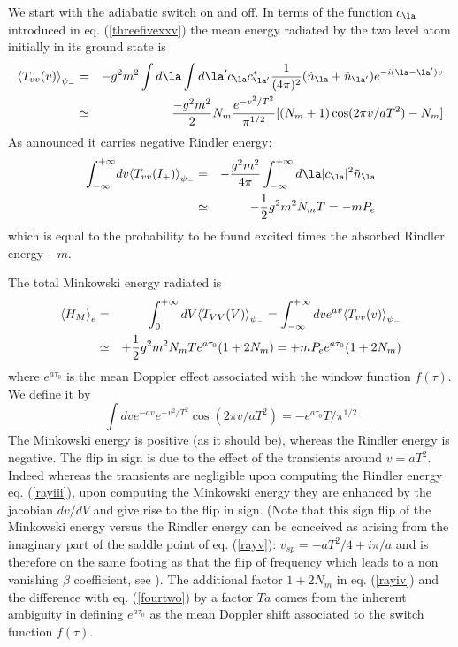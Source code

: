 \documentclass[12pt]{article}
\begin{document}
We start with the adiabatic switch on and off.
In terms of the function
 $c_\la$ introduced in eq. (\ref{threefivexxv}) the mean energy
radiated by the two
level atom
initially in its ground state is
\begin{eqnarray}
\bk{T_{vv}(v)}_{\psi_-}  &=& -
g^2m^2\int d\la \int d\la^\prime c_\la c^*_{\la^\prime}
{1 \over (4 \pi)^2} (\tilde n_\la + \tilde n_{\la^\prime})
e^{-i(\la-\la^\prime)v}
\nonumber\\
&\simeq&{-
{g^2 m^2} \over 2  }
N_m  { e^{-v^2/T^2} \over\pi^{1/2}}
[ (N_m + 1) \cos (2 \pi v/aT^2) - N_m]
\label{rayii}
\end{eqnarray}
As announced it carries negative
Rindler energy:
 \begin{eqnarray}
\int^{+\infty}_{-\infty} \!dv \bk{T_{vv}(I_+)}_{\psi_-} &=& -  {g^2
m^2 \over 4 \pi} \int^{+\infty}_{-\infty}
d\la
\vert c_\la \vert^2  \tilde n_\la
 \nonumber\\  &\simeq&
-{1 \over 2}g^2 m^2 N_mT= -m P_{e}
\label{rayiii}
\end{eqnarray}
which is equal to the probability to be found excited times the absorbed
Rindler energy
$-m$.

The total Minkowski energy radiated is
\begin{eqnarray} \mbox{$ \langle H_M \rangle $}_e &=& \int^{+\infty}_0
dV \mbox{$ \langle T_{VV}(V) \rangle $}_{\psi_-} =
 \int^{+\infty}_{-\infty}  dv  e^{av} \mbox{$ \langle T_{vv}(v) \rangle $}_{\psi_-}\nonumber\\
&\simeq& +{1 \over
2} g^2 m^2   N_m T e^{a \tau_0}(1 + 2 N_m)= +m P_{e} e^{a \tau_0}
(1 + 2 N_m)
\label{rayiv}
\end{eqnarray}
where $ e^{a \tau_0}$ is the mean Doppler
effect associated with the window
function $f(\tau)$. We define it by
\begin{equation}
\int\! dv e^{-av} e^{-v^2/T^2} \cos(2 \pi v/aT^2) = - e^{a \tau_0} T/\pi^{1/2}
\label{rayv}\end{equation}
The Minkowski energy is positive (as it should be), whereas the Rindler
energy
is negative. The flip in sign is due to the effect of the transients
around $v = aT^2$.
Indeed whereas
the transients
 are negligible upon computing the Rindler energy eq. (\ref{rayiii}),
upon computing
the Minkowski energy they are enhanced by the jacobian $dv/dV$ and give
rise to the flip in sign.
(Note that this sign flip of the Minkowski energy versus the
Rindler energy can be conceived as arising from the imaginary part of
the saddle point
of eq. (\ref{rayv}): $v_{sp} = -a T^2/4 + i \pi /a$ and is therefore on the
same footing as  that the flip of frequency which leads
to a non vanishing $\beta$ coefficient, see \cite{pbt}). The additional
factor $1+ 2N_m $ in eq. (\ref{rayiv}) and the difference with
eq. (\ref{fourtwo})
by a factor $Ta$
 comes from
the inherent ambiguity in defining $e^{a \tau_0}$ as the mean
Doppler shift associated to the  switch  function $f(\tau)$.
\end{document}
